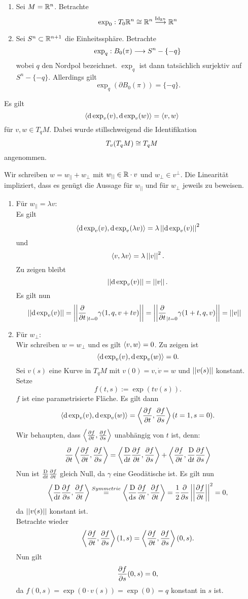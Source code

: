 \Bsp{}
\begin{enumerate}[1)]
	\item Sei $M = \mathbb{R}^n$. Betrachte
	\[ \exp_0 : T_0\mathbb{R}^n\overset{}{\cong} \mathbb{R}^n \overset{\text{Id}_{\mathbb{R}^n}}{\longrightarrow} \mathbb{R}^n \]
	\item Sei $S^n \subset \mathbb{R}^{n+1}$ die Einheitssphäre. Betrachte
	\[ \exp_q  : B_0(\pi) \overset{}{\longrightarrow} S^n - \{-q\} \]
	wobei $q$ den Nordpol bezeichnet. $\exp_q$ ist dann tatsächlich surjektiv auf $S^n - \{-q\}$. Allerdings gilt
	\[ \exp_q(\partial B_0(\pi)) = \{-q\}. \]
\end{enumerate}

Es gilt
\[ \left<\text{d} \exp_v(v), \text{d} \exp_v(w)\right> = \left<v,w\right> \]
für $v,w \in T_qM$. Dabei wurde stillschweigend die Identifikation
\[ T_v(T_qM) \overset{}{\cong} T_qM \]
angenommen.
\begin{Beweis}{}
Wir schreiben $w = w_{||} + w_\bot$ mit $w_{||} \in \mathbb{R}\cdot {v}$ und $w_\bot \in v^\bot$. Die Linearität impliziert, dass es genügt die Aussage für $w_{||}$ und für $w_\bot$ jeweils zu beweisen.
\begin{enumerate}[1)]
	\item Für $w_{||} = \lambda v$:\\
	Es gilt
	\begin{align*}
	\left<\text{d} \exp_v(v), \text{d} \exp_v(\lambda v)\right> = {\lambda} \left|\left|\text{d} \exp_v(v)\right|\right|^2
	\end{align*} 
	und
	\[ \left<v,\lambda v\right> = \lambda \left|\left|v\right|\right|^2. \]
	Zu zeigen bleibt
	\[ \left|\left|\text{d} \exp_v(v)\right|\right| = \left|\left|v\right|\right|. \]
	Es gilt nun
	\begin{align*}
	\left|\left|\text{d} \exp_v(v)\right|\right| &= \left|\left|\frac{\partial }{\partial t}_{|t = 0} \gamma(1,q, v+tv)\right|\right| =\left|\left| \frac{\partial }{\partial t}_{|t = 0} \gamma(1+t, q, v)\right|\right| = \left|\left|v\right|\right|
	\end{align*}
	\item Für $w_\bot $:\\
	Wir schreiben $w = w_\bot$ und es gilt $\left<v,w\right> = 0$. Zu zeigen ist
	\[ \left<\text{d} \exp_v(v), \text{d} \exp_v(w)\right> = 0. \]
	Sei $v(s)$ eine Kurve in $T_qM$ mit $v(0) = v, \dot{v} = w$ und $\left|\left|v(s)\right|\right|$ konstant. Setze
	\[ f(t,s) := \exp(tv(s)). \]
	$f$ ist eine parametrisierte Fläche. Es gilt dann
	\[ \left<\text{d} \exp_v(v), \text{d} \exp_v(w)\right> = \left<\frac{\partial f}{\partial t}, \frac{\partial f}{\partial s}\right>(t = 1, s = 0). \]
	Wir behaupten, dass $\left<\frac{\partial f}{\partial t}, \frac{\partial f}{\partial s}\right>$ unabhängig von $t$ ist, denn:
	\begin{align*}
	\frac{\partial }{\partial t} \left<\frac{\partial f}{\partial t}, \frac{\partial f}{\partial s}\right> = \left<\frac{\text{D}}{\text{d} t} \frac{\partial f}{\partial t}, \frac{\partial f}{\partial s}\right> +  \left< \frac{\partial f}{\partial t}, \frac{\text{D}}{\text{d} t}\frac{\partial f}{\partial s}\right>
	\end{align*}
	Nun ist $\frac{\text{D}}{\text{d} t} \frac{\partial f}{\partial t}$ gleich Null, da $\gamma$ eine Geodätische ist. Es gilt nun
	\begin{align*}
	\left<\frac{\text{D}}{\text{d} t} \frac{\partial f}{\partial s}, \frac{\partial f}{\partial t}\right> \overset{Symmetrie}{=} \left<\frac{\text{D}}{\text{d} s}\frac{\partial f}{\partial t}, \frac{\partial f}{\partial t} \right> = \frac{1}{2} \frac{\partial }{\partial s} \left|\left|\frac{\partial f}{\partial t}\right|\right|^2 = 0,
	\end{align*}
	da $\left|\left|v(s)\right|\right|$ konstant ist.\\
	
	Betrachte wieder
	\[ \left<\frac{\partial f}{\partial t}, \frac{\partial f}{\partial s}\right>(1, s) = \left<\frac{\partial f}{\partial t}, \frac{\partial f}{\partial s}\right> (0,s). \]
	Nun gilt
	\[ \frac{\partial f}{\partial s}(0,s) = 0, \]
	da $f(0,s) = \exp(0\cdot v(s)) = \exp(0) = q$ konstant in $s$ ist.
\end{enumerate}
\end{Beweis}
